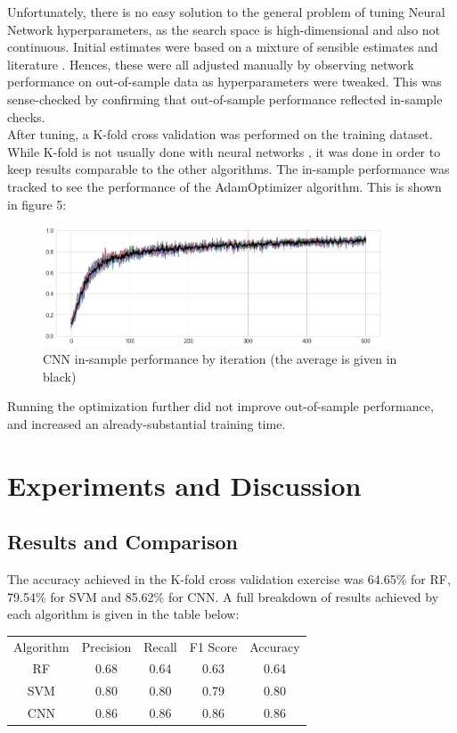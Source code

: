 \documentclass[12pt]{article}
\begin{document}
Unfortunately, there is no easy solution to the general problem of tuning Neural Network hyperparameters, as the search space is high-dimensional and also not continuous. Initial estimates were based on a mixture of sensible estimates and literature \citep{nnoptim}. Hences, these were all adjusted manually by observing network performance on out-of-sample data as hyperparameters were tweaked. This was sense-checked by confirming that out-of-sample performance reflected in-sample checks. \\

After tuning, a K-fold cross validation was performed on the training dataset. While K-fold is not usually done with neural networks \citep{nnoptim}, it was done in order to keep results comparable to the other algorithms. The in-sample performance was tracked to see the performance of the AdamOptimizer algorithm. This is shown in figure 5:\\

\begin{figure}[h]
\caption{CNN in-sample performance by iteration (the average is given in black)}
\centering
\includegraphics[width=0.9\textwidth]{images/training-progress.png}
\end{figure}

Running the optimization further did not improve out-of-sample performance, and increased an already-substantial training time.

\section{Experiments and Discussion}
\subsection{Results and Comparison}

The accuracy achieved in the K-fold cross validation exercise was 64.65\% for RF, 79.54\% for SVM and 85.62\% for CNN. A full breakdown of results achieved by each algorithm is given in the table below:\\
\begin{center}
\begin{tabular}{ c c c c c }
 Algorithm & Precision & Recall & F1 Score & Accuracy\\ 
 RF & 0.68 & 0.64 & 0.63 & 0.64 \\  
SVM & 0.80 & 0.80 & 0.79 & 0.80\\
CNN & 0.86 & 0.86 & 0.86 & 0.86                    
\end{tabular}
\end{center}
\end{document}

